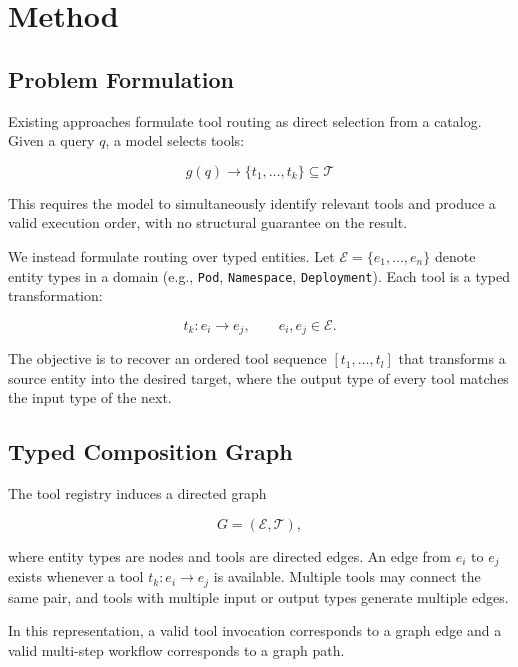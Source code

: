 
\section{Method}
\label{sec:method}

\subsection{Problem Formulation}
\label{sec:problem-def}

Existing approaches formulate tool routing as direct selection from a catalog.
Given a query $q$, a model selects tools:

\begin{equation}
    g(q) \rightarrow \{t_1, \ldots, t_k\} \subseteq \mathcal{T}
\end{equation}

This requires the model to simultaneously identify relevant tools and produce a valid execution order, with no structural guarantee on the result.

We instead formulate routing over typed entities.
Let $\mathcal{E} = \{e_1, \ldots, e_n\}$ denote entity types in a domain (e.g., \texttt{Pod}, \texttt{Namespace}, \texttt{Deployment}).
Each tool is a typed transformation:

\begin{equation}
    t_k : e_i \rightarrow e_j,
    \qquad
    e_i,e_j \in \mathcal{E}.
    \label{eq:tool-transform}
\end{equation}

The objective is to recover an ordered tool sequence $[t_1,\ldots,t_l]$ that transforms a source entity into the desired target, where the output type of every tool matches the input type of the next.

\subsection{Typed Composition Graph}
\label{sec:typed-graph}

The tool registry induces a directed graph

\[
G=(\mathcal{E},\mathcal{T}),
\]

where entity types are nodes and tools are directed edges.
An edge from $e_i$ to $e_j$ exists whenever a tool $t_k:e_i\rightarrow e_j$ is available.
Multiple tools may connect the same pair, and tools with multiple input or output types generate multiple edges.

In this representation, a valid tool invocation corresponds to a graph edge and a valid multi-step workflow corresponds to a graph path.

